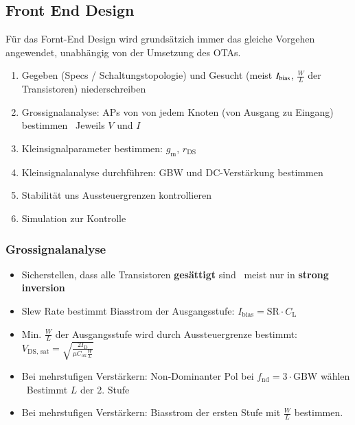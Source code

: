 
\columnbreak



\subsection{Front End Design}

Für das Fornt-End Design wird grundsätzich immer das gleiche Vorgehen angewendet, unabhängig von der Umsetzung des OTAs.

\smallskip

\begin{enumerate}
    \item Gegeben (Specs / Schaltungstopologie) und Gesucht (meist $I_{\rm bias}$, $\frac{W}{L}$ der Transistoren) niederschreiben
    \item Grossignalanalyse: APs von von jedem Knoten (von Ausgang zu Eingang) bestimmen \textrightarrow\ Jeweils $V$ und $I$
    \item Kleinsignalparameter bestimmen: $g_\text{m}$, $r_\text{DS}$
    \item Kleinsignalanalyse durchführen: GBW und DC-Verstärkung bestimmen
    \item Stabilität uns Aussteuergrenzen kontrollieren
    \item Simulation zur Kontrolle
\end{enumerate}


\subsubsection{Grossignalanalyse}

\begin{itemize}
    \item Sicherstellen, dass alle Transistoren \textbf{gesättigt} sind \textrightarrow\ meist nur in \textbf{strong inversion}
    \item Slew Rate bestimmt Biasstrom der Ausgangsstufe: $I_\text{bias} = \text{SR} \cdot C_\text{L}$
    \item Min. $\frac{W}{L}$ der Ausgangsstufe wird durch Aussteuergrenze bestimmt: $V_\text{DS, sat} = \sqrt{\frac{2 I_\text{D}}{\mu C_\text{ox} \frac{W}{L}}}$
    \item Bei mehrstufigen Verstärkern: Non-Dominanter Pol bei $f_\text{nd} = 3 \cdot \text{GBW}$ wählen \\
        \textrightarrow\ Bestimmt $L$ der 2. Stufe
    \item Bei mehrstufigen Verstärkern: Biasstrom der ersten Stufe mit $\frac{W}{L}$ bestimmen.
\end{itemize}


